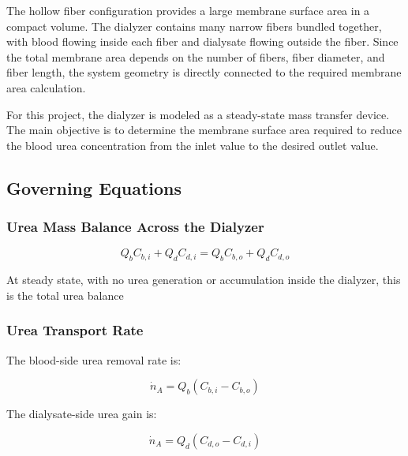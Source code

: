 \documentclass[10.5pt]{article}
\begin{document}
\vspace{-0.2cm}



The hollow fiber configuration provides a large membrane surface area in a compact volume. The dialyzer contains many narrow fibers bundled together, with blood flowing inside each fiber and dialysate flowing outside the fiber. Since the total membrane area depends on the number of fibers, fiber diameter, and fiber length, the system geometry is directly connected to the required membrane area calculation\cite{sinha_computational_2025}.

For this project, the dialyzer is modeled as a steady-state mass transfer device. The main objective is to determine the membrane surface area required to reduce the blood urea concentration from the inlet value to the desired outlet value.

\subsection{Governing Equations}


\subsubsection{Urea Mass Balance Across the Dialyzer}

\begin{equation}
Q_b C_{b,i} + Q_d C_{d,i }= Q_b C_{b,o} + Q_d C_{d,o}
\end{equation}

At steady state, with no urea generation or accumulation inside the dialyzer, this is the total urea balance


\subsubsection{Urea Transport Rate}

The blood-side urea removal rate is:

\vspace{-1cm}

\begin{equation}
\dot{n}_A = Q_b(C_{b,i}-C_{b,o})
\end{equation}

The dialysate-side urea gain is:

\vspace{-1cm}

\begin{equation}
\dot{n}_A = Q_d(C_{d,o}-C_{d,i})
\end{equation}
\end{document}
